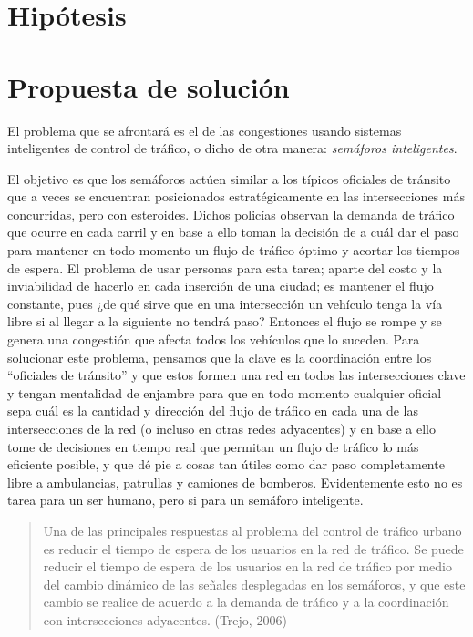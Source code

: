 \hypertarget{hipuxf3tesis}{%
\section{Hipótesis}\label{hipuxf3tesis}}

\hypertarget{propuesta-de-soluciuxf3n}{%
\section{Propuesta de solución}\label{propuesta-de-soluciuxf3n}}

El problema que se afrontará es el de las congestiones usando sistemas
inteligentes de control de tráfico, o dicho de otra manera:
\emph{semáforos inteligentes}.

El objetivo es que los semáforos actúen similar a los típicos oficiales
de tránsito que a veces se encuentran posicionados estratégicamente en
las intersecciones más concurridas, pero con esteroides. Dichos policías
observan la demanda de tráfico que ocurre en cada carril y en base a
ello toman la decisión de a cuál dar el paso para mantener en todo
momento un flujo de tráfico óptimo y acortar los tiempos de espera. El
problema de usar personas para esta tarea; aparte del costo y la
inviabilidad de hacerlo en cada inserción de una ciudad; es mantener el
flujo constante, pues ¿de qué sirve que en una intersección un vehículo
tenga la vía libre si al llegar a la siguiente no tendrá paso? Entonces
el flujo se rompe y se genera una congestión que afecta todos los
vehículos que lo suceden. Para solucionar este problema, pensamos que la
clave es la coordinación entre los ``oficiales de tránsito'' y que estos
formen una red en todos las intersecciones clave y tengan mentalidad de
enjambre para que en todo momento cualquier oficial sepa cuál es la
cantidad y dirección del flujo de tráfico en cada una de las
intersecciones de la red (o incluso en otras redes adyacentes) y en base
a ello tome de decisiones en tiempo real que permitan un flujo de
tráfico lo más eficiente posible, y que dé pie a cosas tan útiles como
dar paso completamente libre a ambulancias, patrullas y camiones de
bomberos. Evidentemente esto no es tarea para un ser humano, pero si
para un semáforo inteligente.

\begin{quote}
Una de las principales respuestas al problema del control de tráfico
urbano es reducir el tiempo de espera de los usuarios en la red de
tráfico. Se puede reducir el tiempo de espera de los usuarios en la red
de tráfico por medio del cambio dinámico de las señales desplegadas en
los semáforos, y que este cambio se realice de acuerdo a la demanda de
tráfico y a la coordinación con intersecciones adyacentes. (Trejo, 2006)
\end{quote}

